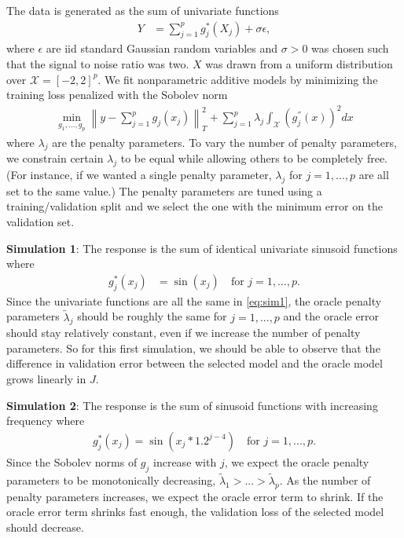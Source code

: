 \documentclass[12pt]{article}
\begin{document}
The data is generated as the sum of univariate functions
\begin{align}
Y &= \sum_{j=1}^p g_j^*(X_j) + \sigma \epsilon,
\label{eq:sim_general}
\end{align}
where $\epsilon$ are iid standard Gaussian random variables and $\sigma > 0$ was chosen such that the signal to noise ratio was two. $X$ was drawn from a uniform distribution over $\mathcal{X} = [-2, 2]^p$.
We fit nonparametric additive models by minimizing the training loss penalized with the Sobolev norm
\begin{align}
	\min_{g_1, ..., g_p} \left \| y - \sum_{j=1}^p g_j(x_j) \right \|_T^2 + \sum_{j=1}^p \lambda_j \int_{\mathcal{X}} \left (g_j^{''}(x) \right )^2 dx
	\label{eq:penal_simulation}
\end{align}
where $\lambda_j$ are the penalty parameters.
To vary the number of penalty parameters, we constrain certain $\lambda_j$ to be equal while allowing others to be completely free.
(For instance, if we wanted a single penalty parameter, $\lambda_j$ for $j=1,...,p$ are all set to the same value.) 
The penalty parameters are tuned using a training/validation split and we select the one with the minimum error on the validation set.

\textbf{Simulation 1}: The response is the sum of identical univariate sinusoid functions where
\begin{align}
g_j^*(x_j) &= \sin(x_j) \quad \text{for } j = 1,...,p.
\label{eq:sim1}
\end{align} 
Since the univariate functions are all the same in \eqref{eq:sim1}, the oracle penalty parameters $\tilde \lambda_j$ should be roughly the same for $j = 1,...,p$ and the oracle error should stay relatively constant, even if we increase the number of penalty parameters. So for this first simulation, we should be able to observe that the difference in validation error between the selected model and the oracle model grows linearly in $J$.

\textbf{Simulation 2}: The response is the sum of sinusoid functions with increasing frequency where
\begin{align}
g_j^*(x_j) = \sin(x_j * 1.2^{j - 4}) \quad \text{for } j = 1,...,p.
\label{eq:sim2}
\end{align}
Since the Sobolev norms of $g_j$ increase with $j$, we expect the oracle penalty parameters to be monotonically decreasing, $\tilde{\lambda}_1 > ... > \tilde{\lambda}_p$. 
As the number of penalty parameters increases, we expect the oracle error term to shrink. If the oracle error term shrinks fast enough, the validation loss of the selected model should decrease.
\end{document}
